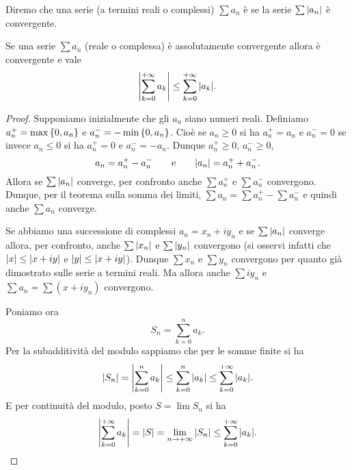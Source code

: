 \begin{definition}
\mymark{***}
Diremo che una serie (a termini reali o complessi) $\sum a_n$
è  se la serie $\sum {\left|a_n\right|}$
è convergente.
\end{definition}

\begin{theorem}\label{th:convergenza_assoluta}
\mymark{***}%
Se una serie $\sum a_n$ (reale o complessa)
è assolutamente convergente allora è convergente e vale
\[
  {\left|\sum_{k=0}^{+\infty} a_k\right|} \le \sum_{k=0}^{+\infty} {\left|a_k\right|}.
\]
\end{theorem}
%
\begin{proof}
\mymark{*}
Supponiamo inizialmente che gli $a_n$ siano numeri reali.
Definiamo $a_n^+ = \max{\left\{ 0, a_n \right\}}$ e $a_n^- = -\min {\left\{ 0, a_n \right\}}$.
Cioè se $a_n\ge 0$ si ha $a_n^+ = a_n$ e $a_n^-=0$ se invece $a_n\le 0$
si ha $a_n^+ =0$ e $a_n^- = -a_n$.
Dunque $a_n^+\ge 0$, $a_n^-\ge 0$,
\[
   a_n = a_n^+  - a_n^-
   \qquad\text{e}\qquad
   {\left|a_n\right|} = a_n^+ + a_n^-.
\]
Allora se $\sum {\left|a_n\right|}$ converge,
per confronto anche $\sum a_n^+$ e $\sum a_n^-$ convergono.
Dunque, per il teorema sulla somma dei limiti,
$\sum a_n = \sum a_n^+ - \sum a_n^-$
e quindi anche $\sum a_n$ converge.

Se abbiamo una successione di complessi $a_n = x_n + i y_n$
e se
$\sum {\left|a_n\right|}$ converge allora, per confronto,
anche $\sum {\left|x_n\right|}$ e $\sum{\left|y_n\right|}$ convergono
(si osservi infatti che ${\left|x\right|} \le {\left|x+iy\right|}$ e ${\left|y\right|}\le {\left|x+iy\right|}$).
Dunque $\sum x_n$ e $\sum y_n$ convergono per quanto
già dimostrato sulle serie a termini reali.
Ma allora anche $\sum i y_n$ e $\sum a_n = \sum (x + iy_n)$ convergono.

Poniamo ora
\[
  S_n  = \sum_{k=0}^n a_k.
\]
Per la subadditività
del modulo sappiamo che per le somme finite si ha
\[
 {\left|S_n\right|} ={\left|\sum_{k=0}^n a_k\right|}
 \le \sum_{k=0}^n {\left|a_k\right|} \le \sum_{k=0}^{+\infty} {\left|a_k\right|}.
\]
E per continuità del modulo, posto $S= \lim S_n$ si ha
\[
  {\left|\sum_{k=0}^{+\infty} a_k\right|}
  = {\left|S\right|}
  = \lim_{n\to +\infty} {\left|S_n\right|}
  \le \sum_{k=0}^{+\infty} {\left|a_k\right|}.
\]
\end{proof}

